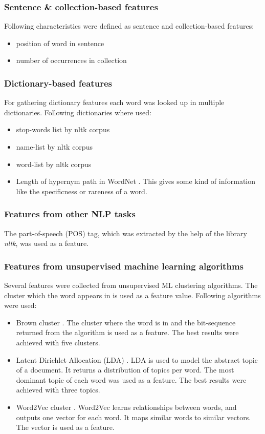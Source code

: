 \documentclass[12pt]{book}
\begin{document}
	\subsubsection{Sentence \& collection-based features}
	
	Following characteristics were defined as sentence and collection-based features:
	\begin{itemize}
		\item position of word in sentence
		\item number of occurrences in collection
	\end{itemize}
	
	\subsubsection{Dictionary-based features}
	
	For gathering dictionary features each word was looked up in multiple dictionaries. Following dictionaries where used:
	\begin{itemize}
		\item stop-words list by nltk corpus
		\item name-list by nltk corpus
		\item word-list by nltk corpus
		\item Length of hypernym path in WordNet \cite{wordnet}. This gives some kind of information like the specificness or rareness of a word.
	\end{itemize}

	\subsubsection{Features from other NLP tasks}
	
	The part-of-speech (POS) tag, which was extracted by the help of the library \textit{nltk}, was used as a feature.
	
	\subsubsection{Features from unsupervised machine learning algorithms}
	Several features were collected from unsupervised ML clustering algorithms. The cluster which the word appears in is used as a feature value.
	Following algorithms were used:
	\begin{itemize}
		\item Brown cluster \cite{brown1992class}. The cluster where the word is in and the bit-sequence returned from the algorithm is used as a feature. The best results were achieved with five clusters.
		\item Latent Dirichlet Allocation (LDA) \cite{blei2003latent}. LDA is used to model the abstract topic of a document. It returns a distribution of topics per word. The most dominant topic of each word was used as a feature. The best results were achieved with three topics.
		\item Word2Vec cluster \cite{w2vgensim}. Word2Vec learns relationships between words, and outputs one vector for each word. It maps similar words to similar vectors. The vector is used as a feature.
	\end{itemize}
	
\end{document}
